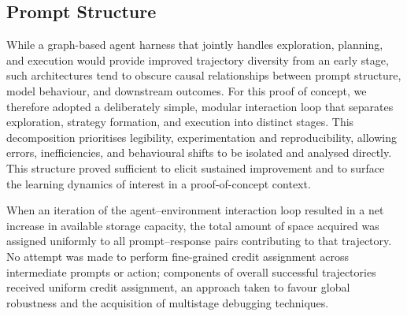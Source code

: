 \documentclass{article}
\begin{document}
\subsection{Prompt Structure}
While a graph-based agent harness that jointly handles exploration, planning, and execution would provide improved trajectory diversity from an early stage, such architectures tend to obscure causal relationships between prompt structure, model behaviour, and downstream outcomes.  For this proof of concept, we therefore adopted a deliberately simple, modular interaction loop that separates exploration, strategy formation, and execution into distinct stages. This decomposition prioritises legibility, experimentation and reproducibility, allowing errors, inefficiencies, and behavioural shifts to be isolated and analysed directly. This structure proved sufficient to elicit sustained improvement and to surface the learning dynamics of interest in a proof-of-concept context. 

When an iteration of the agent–environment interaction loop resulted in a net increase in available storage capacity, the total amount of space acquired was assigned uniformly to all prompt–response pairs contributing to that trajectory. No attempt was made to perform fine-grained credit assignment across intermediate prompts or action; components of overall successful trajectories received uniform credit assignment, an approach taken to favour global robustness and the acquisition of multistage debugging techniques.
\end{document}
